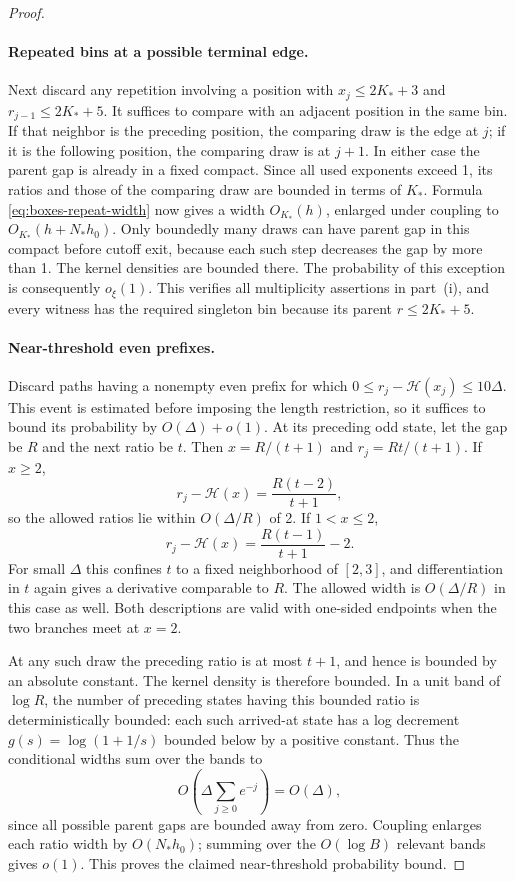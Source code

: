 \begin{proof}
\paragraph{Repeated bins at a possible terminal edge.}
Next discard any repetition involving a position with
$x_j\le2K_*+3$ and $r_{j-1}\le2K_*+5$.  It suffices to compare
with an adjacent position in the same bin.  If that neighbor is
the preceding position, the comparing draw is the edge at $j$;
if it is the following position, the comparing draw is at $j+1$.
In either case the parent gap is already in a fixed compact.
Since all used exponents exceed 1, its ratios and those of the
comparing draw are bounded in terms of $K_*$.  Formula
\eqref{eq:boxes-repeat-width} now gives a width $O_{K_*}(h)$,
enlarged under coupling to $O_{K_*}(h+N_*h_0)$.
Only boundedly many draws can have parent gap in this compact
before cutoff exit, because each such step decreases the gap by
more than 1.  The kernel densities are bounded there.  The
probability of this exception is consequently $o_\xi(1)$.
This verifies all multiplicity assertions in part~(i), and every
witness has the required singleton bin because its parent
$r\le2K_*+5$.

\paragraph{Near-threshold even prefixes.}
Discard paths having a nonempty even prefix for which
$0\le r_j-\mathcal H(x_j)\le10\Delta$.  This event is estimated before
imposing the length restriction, so it suffices to bound its
probability by $O(\Delta)+o(1)$.
At its preceding odd state, let the gap be $R$ and the next ratio
be $t$.  Then $x=R/(t+1)$ and $r_j=Rt/(t+1)$.  If $x\ge2$,
\[
 r_j-\mathcal H(x)=\frac{R(t-2)}{t+1},
\]
so the allowed ratios lie within $O(\Delta/R)$ of 2.  If $1<x\le2$,
\[
 r_j-\mathcal H(x)=\frac{R(t-1)}{t+1}-2.
\]
For small $\Delta$ this confines $t$ to a fixed neighborhood of
$[2,3]$, and differentiation in $t$ again gives a derivative
comparable to $R$.  The allowed width is $O(\Delta/R)$ in this
case as well.  Both descriptions are valid with one-sided
endpoints when the two branches meet at $x=2$.

At any such draw the preceding ratio is at most $t+1$, and hence
is bounded by an absolute constant.  The kernel density is
therefore bounded.  In a unit band of $\log R$, the number of
preceding states having this bounded ratio is deterministically
bounded: each such arrived-at state has a log decrement
$g(s)=\log(1+1/s)$ bounded below by a positive constant.  Thus
the conditional widths sum over the bands to
\[
 O\left(\Delta\sum_{j\ge0}e^{-j}\right)=O(\Delta),
\]
since all possible parent gaps are bounded away from zero.
Coupling enlarges each ratio width by $O(N_*h_0)$; summing over
the $O(\log B)$ relevant bands gives $o(1)$.  This proves the
claimed near-threshold probability bound.


\end{proof}

